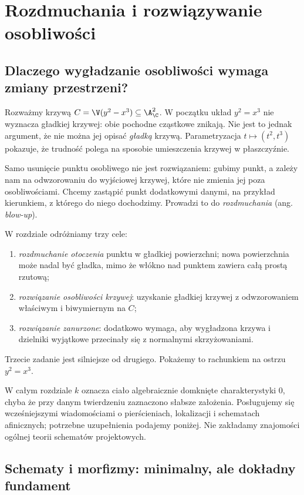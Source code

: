 \chapter{Rozdmuchania i rozwiązywanie osobliwości}
\label{ch:ga5-rozdmuchania}

\section{Dlaczego wygładzanie osobliwości wymaga zmiany przestrzeni?}
\label{sec:ga5-motywacja}

Rozważmy krzywą $C=\V(y^2-x^3)\subseteq\A^2_\C$. W początku układ
$y^2=x^3$ nie wyznacza gładkiej krzywej: obie pochodne cząstkowe
znikają. Nie jest to jednak argument, że nie można jej opisać
\emph{gładką} krzywą. Parametryzacja $t\mapsto(t^2,t^3)$ pokazuje, że
trudność polega na sposobie umieszczenia krzywej w płaszczyźnie.

Samo usunięcie punktu osobliwego nie jest rozwiązaniem: gubimy punkt,
a zależy nam na odwzorowaniu do wyjściowej krzywej, które nie zmienia
jej poza osobliwościami. Chcemy zastąpić punkt dodatkowymi danymi,
na przykład kierunkiem, z którego do niego dochodzimy. Prowadzi to
do \emph{rozdmuchania} (ang. \emph{blow-up}).

W rozdziale odróżniamy trzy cele:
\begin{enumerate}[label=\arabic*)]
\item \emph{rozdmuchanie otoczenia} punktu w gładkiej powierzchni;
      nowa powierzchnia może nadal być gładka, mimo że włókno nad
      punktem zawiera całą prostą rzutową;
\item \emph{rozwiązanie osobliwości krzywej}: uzyskanie gładkiej
      krzywej z odwzorowaniem właściwym i biwymiernym na $C$;
\item \emph{rozwiązanie zanurzone}: dodatkowo wymaga, aby wygładzona
      krzywa i dzielniki wyjątkowe przecinały się z normalnymi
      skrzyżowaniami.
\end{enumerate}
Trzecie zadanie jest silniejsze od drugiego. Pokażemy to rachunkiem
na ostrzu $y^2=x^3$.

W całym rozdziale $k$ oznacza ciało algebraicznie domknięte
charakterystyki $0$, chyba że przy danym twierdzeniu zaznaczono
słabsze założenia. Posługujemy się wcześniejszymi wiadomościami
o pierścieniach, lokalizacji i schematach afinicznych; potrzebne
uzupełnienia podajemy poniżej. Nie zakładamy znajomości ogólnej
teorii schematów projektowych.

\section{Schematy i morfizmy: minimalny, ale dokładny fundament}
\label{sec:ga5-schematy}

